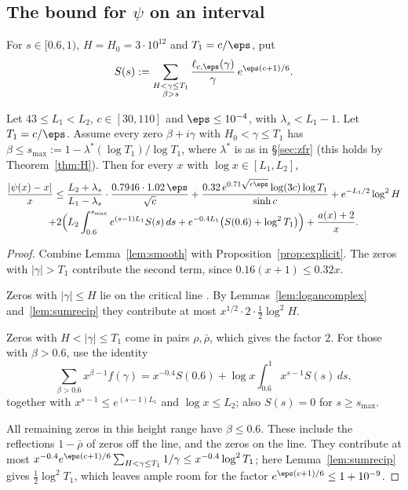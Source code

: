 \subsection{The bound for $\psi$ on an interval}
For $s \in [0.6, 1)$, $H = H_0 = 3\cdot 10^{12}$ and $T_1 = c/\eps$, put
\[
S(s) := \sum_{\substack{H < \gamma \le T_1\\ \beta > s}} \frac{\ell_{c,\eps}(\gamma)}{\gamma}\,e^{\eps(c+1)/6}.
\]

\begin{proposition}\label{prop:master}
Let $43 \le L_1 < L_2$, $c \in [30,110]$ and $\eps \le 10^{-4}$, with $\lambda_s < L_1 - 1$. Let $T_1 = c/\eps$.
Assume every zero $\beta+i\gamma$ with $H_0<\gamma \le T_1$ has $\beta \le s_{\max} := 1 - \lambda^*(\log T_1)/\log T_1$, where $\lambda^*$ is as in \S\ref{sec:zfr} (this holds by Theorem~\ref{thm:H}).
Then for every $x$ with $\log x\in[L_1,L_2]$,
\begin{multline*}
\frac{|\psi(x)-x|}{x} \le \frac{L_2+\lambda_s}{L_1-\lambda_s}\cdot\frac{0.7946\cdot 1.02\,\eps}{\sqrt c}
+ \frac{0.32\,e^{0.71\sqrt{c\eps}}\log(3c)\log T_1}{\sinh c} + e^{-L_1/2}\log^2 H\\
+ 2\Big(L_2\int_{0.6}^{s_{\max}} e^{(s-1)L_1}S(s)\,ds + e^{-0.4L_1}\big(S(0.6) + \log^2 T_1\big)\Big) + \frac{a(x)+2}{x}.
\end{multline*}
\end{proposition}

\begin{proof}
Combine Lemma~\ref{lem:smooth} with Proposition~\ref{prop:explicit}.
The zeros with $|\gamma| > T_1$ contribute the second term, since $0.16(x+1) \le 0.32x$.

Zeros with $|\gamma| \le H$ lie on the critical line \cite{PlattTrudgianRH}.
By Lemmas~\ref{lem:logancomplex} and~\ref{lem:sumrecip} they contribute at most $x^{1/2}\cdot2\cdot\frac12\log^2H$.

Zeros with $H < |\gamma| \le T_1$ come in pairs $\rho,\bar\rho$, which gives the factor $2$.
For those with $\beta > 0.6$, use the identity
\[
\sum_{\beta>0.6} x^{\beta-1}f(\gamma) = x^{-0.4}S(0.6) + \log x\int_{0.6}^1 x^{s-1}S(s)\,ds,
\]
together with $x^{s-1} \le e^{(s-1)L_1}$ and $\log x \le L_2$; also $S(s) = 0$ for $s \ge s_{\max}$.

All remaining zeros in this height range have $\beta \le 0.6$.
These include the reflections $1-\bar\rho$ of zeros off the line, and the zeros on the line.
They contribute at most $x^{-0.4}e^{\eps(c+1)/6}\sum_{H<\gamma\le T_1}1/\gamma \le x^{-0.4}\log^2T_1$; here Lemma~\ref{lem:sumrecip} gives $\frac12\log^2T_1$, which leaves ample room for the factor $e^{\eps(c+1)/6} \le 1 + 10^{-9}$.
\end{proof}

